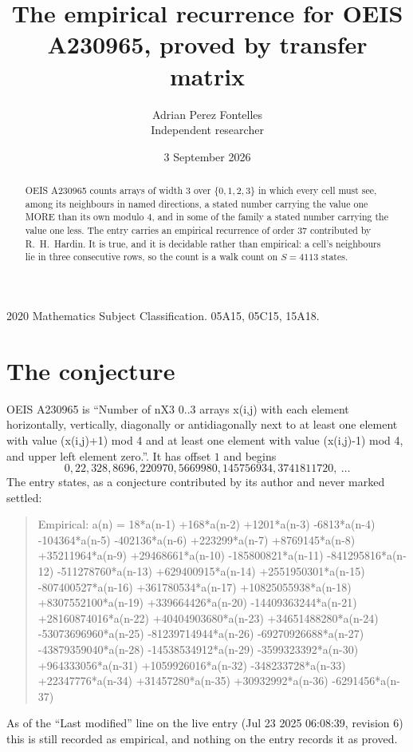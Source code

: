 \documentclass[11pt,a4paper]{article}
\title{The empirical recurrence for OEIS A230965, proved by transfer matrix}
\author{Adrian Perez Fontelles\\ \small Independent researcher}
\date{3 September 2026}
\theoremstyle{plain}
\theoremstyle{definition}
\begin{document}
\maketitle

\begin{abstract}
OEIS A230965 counts arrays of width $3$ over $\{0,1,2,3\}$ in which every cell must see, among its
neighbours in named directions, a stated number carrying the value one MORE than its own
modulo $4$, and in some of the family a stated number carrying the value one less. The entry
carries an empirical recurrence of order $37$ contributed by R.~H.~Hardin. It is true, and
it is decidable rather than empirical: a cell's neighbours lie in three consecutive rows, so
the count is a walk count on $S=4113$ states.
\end{abstract}

\noindent\small 2020 Mathematics Subject Classification. 05A15, 05C15, 15A18.\normalsize

\section{The conjecture}

OEIS A230965 is ``Number of nX3 0..3 arrays x(i,j) with each element horizontally, vertically, diagonally or antidiagonally next to at least one element with value (x(i,j)+1) mod 4 and at least one element with value (x(i,j)-1) mod 4, and upper left element zero.''. It has offset $1$ and begins
\[
0, 22, 328, 8696, 220970, 5669980, 145756934, 3741811720,\ \dots
\]
The entry states, as a conjecture contributed by its author and never marked settled:
\begin{quote}
Empirical: a(n) = 18*a(n-1) +168*a(n-2) +1201*a(n-3) -6813*a(n-4) -104364*a(n-5) -402136*a(n-6) +223299*a(n-7) +8769145*a(n-8) +35211964*a(n-9) +29468661*a(n-10) -185800821*a(n-11) -841295816*a(n-12) -511278760*a(n-13) +629400915*a(n-14) +2551950301*a(n-15) -807400527*a(n-16) +361780534*a(n-17) +10825055938*a(n-18) +8307552100*a(n-19) +339664426*a(n-20) -14409363244*a(n-21) +28160874016*a(n-22) +40404903680*a(n-23) +34651488280*a(n-24) -53073696960*a(n-25) -81239714944*a(n-26) -69270926688*a(n-27) -43879359040*a(n-28) -14538534912*a(n-29) -3599323392*a(n-30) +964333056*a(n-31) +1059926016*a(n-32) -348233728*a(n-33) +22347776*a(n-34) +31457280*a(n-35) +30932992*a(n-36) -6291456*a(n-37)
\end{quote}
As of the ``Last modified'' line on the live entry (Jul 23 2025 06:08:39, revision 6) this is still
recorded as empirical, and nothing on the entry records it as proved.
\end{document}
